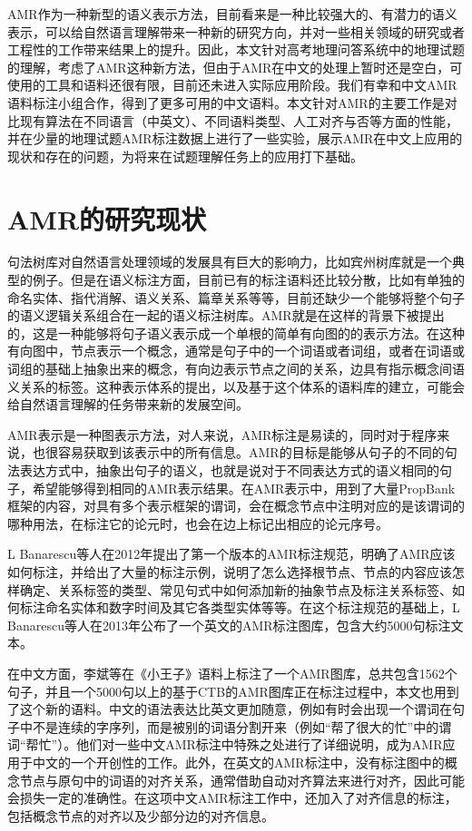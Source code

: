 \documentclass[master, winfont]{njuthesis}
\begin{document}
AMR作为一种新型的语义表示方法，目前看来是一种比较强大的、有潜力的语义表示，可以给自然语言理解带来一种新的研究方向，并对一些相关领域的研究或者工程性的工作带来结果上的提升\cite{kai2015improving}\cite{Pan2015}。因此，本文针对高考地理问答系统中的地理试题的理解，考虑了AMR这种新方法，但由于AMR在中文的处理上暂时还是空白，可使用的工具和语料还很有限，目前还未进入实际应用阶段。我们有幸和中文AMR语料标注小组合作，得到了更多可用的中文语料。本文针对AMR的主要工作是对比现有算法在不同语言（中英文）、不同语料类型、人工对齐与否等方面的性能，并在少量的地理试题AMR标注数据上进行了一些实验，展示AMR在中文上应用的现状和存在的问题，为将来在试题理解任务上的应用打下基础。

\section{AMR的研究现状}
句法树库对自然语言处理领域的发展具有巨大的影响力，比如宾州树库就是一个典型的例子。但是在语义标注方面，目前已有的标注语料还比较分散，比如有单独的命名实体、指代消解、语义关系、篇章关系等等，目前还缺少一个能够将整个句子的语义逻辑关系组合在一起的语义标注树库。AMR就是在这样的背景下被提出的，这是一种能够将句子语义表示成一个单根的简单有向图的的表示方法。在这种有向图中，节点表示一个概念，通常是句子中的一个词语或者词组，或者在词语或词组的基础上抽象出来的概念，有向边表示节点之间的关系，边具有指示概念间语义关系的标签。这种表示体系的提出，以及基于这个体系的语料库的建立，可能会给自然语言理解的任务带来新的发展空间。

AMR表示是一种图表示方法\cite{Banarescu2013Abstract}，对人来说，AMR标注是易读的，同时对于程序来说，也很容易获取到该表示中的所有信息。AMR的目标是能够从句子的不同的句法表达方式中，抽象出句子的语义，也就是说对于不同表达方式的语义相同的句子，希望能够得到相同的AMR表示结果。在AMR表示中，用到了大量PropBank框架的内容，对具有多个表示框架的谓词，会在概念节点中注明对应的是该谓词的哪种用法，在标注它的论元时，也会在边上标记出相应的论元序号。

L Banarescu等人\cite{banarescu2012abstract}在2012年提出了第一个版本的AMR标注规范，明确了AMR应该如何标注，并给出了大量的标注示例，说明了怎么选择根节点、节点的内容应该怎样确定、关系标签的类型、常见句式中如何添加新的抽象节点及标注关系标签、如何标注命名实体和数字时间及其它各类型实体等等。在这个标注规范的基础上，L Banarescu等人\cite{Banarescu2013Abstract}在2013年公布了一个英文的AMR标注图库，包含大约5000句标注文本。

在中文方面，李斌等\cite{Li2016Annotating}在《小王子》语料上标注了一个AMR图库，总共包含1562个句子，并且一个5000句以上的基于CTB的AMR图库正在标注过程中，本文也用到了这个新的语料。中文的语法表达比英文更加随意，例如有时会出现一个谓词在句子中不是连续的字序列，而是被别的词语分割开来（例如“帮了很大的忙”中的谓词“帮忙”）。他们对一些中文AMR标注中特殊之处进行了详细说明，成为AMR应用于中文的一个开创性的工作。此外，在英文的AMR标注中，没有标注图中的概念节点与原句中的词语的对齐关系，通常借助自动对齐算法来进行对齐，因此可能会损失一定的准确性。在这项中文AMR标注工作中，还加入了对齐信息的标注，包括概念节点的对齐以及少部分边的对齐信息。
\end{document}
